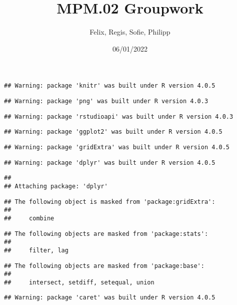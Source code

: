 \documentclass[
]{article}
\title{MPM.02 Groupwork}
\author{Felix, Regis, Sofie, Philipp}
\date{06/01/2022}
\begin{document}
\maketitle

{
\setcounter{tocdepth}{4}
\tableofcontents
}
\begin{verbatim}
## Warning: package 'knitr' was built under R version 4.0.5
\end{verbatim}

\begin{verbatim}
## Warning: package 'png' was built under R version 4.0.3
\end{verbatim}

\begin{verbatim}
## Warning: package 'rstudioapi' was built under R version 4.0.3
\end{verbatim}

\begin{verbatim}
## Warning: package 'ggplot2' was built under R version 4.0.5
\end{verbatim}

\begin{verbatim}
## Warning: package 'gridExtra' was built under R version 4.0.5
\end{verbatim}

\begin{verbatim}
## Warning: package 'dplyr' was built under R version 4.0.5
\end{verbatim}

\begin{verbatim}
## 
## Attaching package: 'dplyr'
\end{verbatim}

\begin{verbatim}
## The following object is masked from 'package:gridExtra':
## 
##     combine
\end{verbatim}

\begin{verbatim}
## The following objects are masked from 'package:stats':
## 
##     filter, lag
\end{verbatim}

\begin{verbatim}
## The following objects are masked from 'package:base':
## 
##     intersect, setdiff, setequal, union
\end{verbatim}

\begin{verbatim}
## Warning: package 'caret' was built under R version 4.0.5
\end{verbatim}
\end{document}

